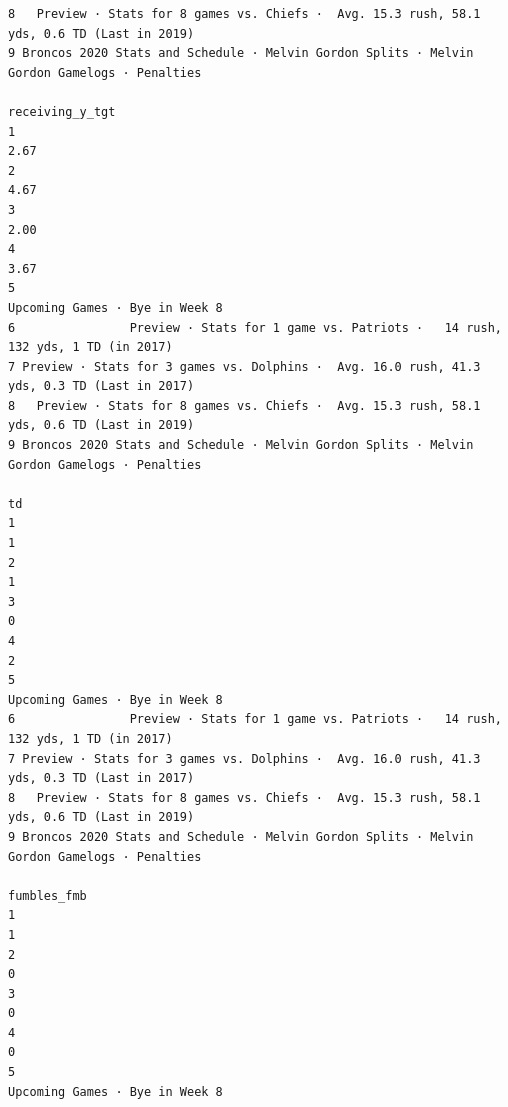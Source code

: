 \documentclass[
]{article}
\begin{document}
\begin{verbatim}
8   Preview · Stats for 8 games vs. Chiefs ·  Avg. 15.3 rush, 58.1 yds, 0.6 TD (Last in 2019)
9 Broncos 2020 Stats and Schedule · Melvin Gordon Splits · Melvin Gordon Gamelogs · Penalties
                                                                              receiving_y_tgt
1                                                                                        2.67
2                                                                                        4.67
3                                                                                        2.00
4                                                                                        3.67
5                                                              Upcoming Games · Bye in Week 8
6                Preview · Stats for 1 game vs. Patriots ·   14 rush, 132 yds, 1 TD (in 2017)
7 Preview · Stats for 3 games vs. Dolphins ·  Avg. 16.0 rush, 41.3 yds, 0.3 TD (Last in 2017)
8   Preview · Stats for 8 games vs. Chiefs ·  Avg. 15.3 rush, 58.1 yds, 0.6 TD (Last in 2019)
9 Broncos 2020 Stats and Schedule · Melvin Gordon Splits · Melvin Gordon Gamelogs · Penalties
                                                                                           td
1                                                                                           1
2                                                                                           1
3                                                                                           0
4                                                                                           2
5                                                              Upcoming Games · Bye in Week 8
6                Preview · Stats for 1 game vs. Patriots ·   14 rush, 132 yds, 1 TD (in 2017)
7 Preview · Stats for 3 games vs. Dolphins ·  Avg. 16.0 rush, 41.3 yds, 0.3 TD (Last in 2017)
8   Preview · Stats for 8 games vs. Chiefs ·  Avg. 15.3 rush, 58.1 yds, 0.6 TD (Last in 2019)
9 Broncos 2020 Stats and Schedule · Melvin Gordon Splits · Melvin Gordon Gamelogs · Penalties
                                                                                  fumbles_fmb
1                                                                                           1
2                                                                                           0
3                                                                                           0
4                                                                                           0
5                                                              Upcoming Games · Bye in Week 8

\end{verbatim}
\end{document}
